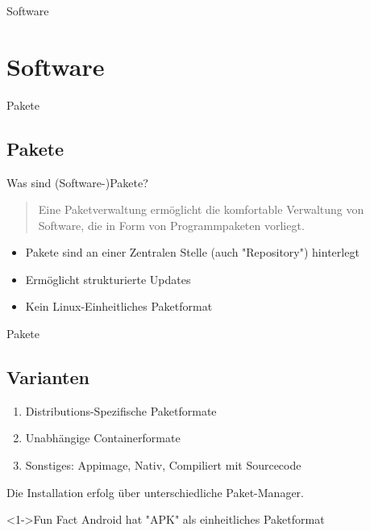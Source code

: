 
\begin{frame}{Software}
    \section{Software}\label{sec:software}
\end{frame}


\begin{frame}{Pakete}
    \subsection{Pakete}\label{subsec:pakete}

    Was sind (Software-)Pakete?
    \pause

    \vspace{0.5cm}
    \begin{quote}
        Eine Paketverwaltung ermöglicht die komfortable Verwaltung von Software, die in Form von Programmpaketen vorliegt.
    \end{quote}
    \pause

    \begin{itemize}
        \item Pakete sind an einer Zentralen Stelle (auch "Repository") hinterlegt\pause
        \item Ermöglicht strukturierte Updates\pause
        \item Kein Linux-Einheitliches Paketformat
    \end{itemize}
\end{frame}

\begin{frame}{Pakete}
    \subsection{Varianten}\label{subsec:varianten}

    \begin{enumerate}
        \item<1-> Distributions-Spezifische Paketformate
        \item<2-> Unabhängige Containerformate
        \item<3-> Sonstiges: Appimage, Nativ, Compiliert mit Sourcecode
    \end{enumerate}

    Die Installation erfolg über unterschiedliche Paket-Manager.

    \vspace{0.5cm}
    \begin{exampleblock}<1->{Fun Fact}
        Android hat "APK" als einheitliches Paketformat
    \end{exampleblock}

\end{frame}

